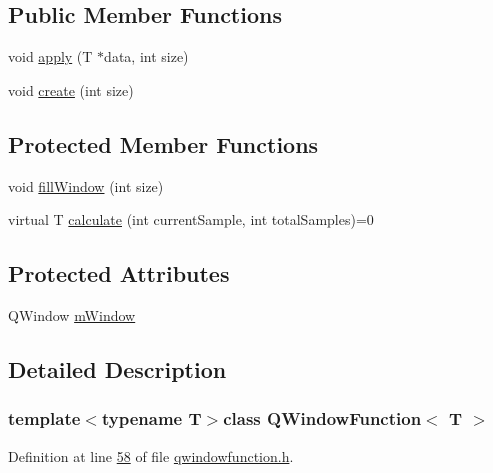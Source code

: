 \subsection*{Public Member Functions}
\begin{DoxyCompactItemize}
\item 
void \hyperlink{a00071_aa4a4f988e1f4b65e4181a0c8c3245a00}{apply} (T $\ast$data, int size)
\item 
void \hyperlink{a00071_a23ec85a35c762367195a47898cc75380}{create} (int size)
\end{DoxyCompactItemize}
\subsection*{Protected Member Functions}
\begin{DoxyCompactItemize}
\item 
void \hyperlink{a00071_abde81294328ded8482380a7cfefab0b9}{fill\+Window} (int size)
\item 
virtual T \hyperlink{a00071_ad58fa8c208b487dc2cbe765053228068}{calculate} (int current\+Sample, int total\+Samples)=0
\end{DoxyCompactItemize}
\subsection*{Protected Attributes}
\begin{DoxyCompactItemize}
\item 
Q\+Window \hyperlink{a00071_ac0e8285a38390b8388bc0be152abcb0a}{m\+Window}
\end{DoxyCompactItemize}


\subsection{Detailed Description}
\subsubsection*{template$<$typename T$>$class Q\+Window\+Function$<$ T $>$}



Definition at line \hyperlink{a00128_source_l00058}{58} of file \hyperlink{a00128_source}{qwindowfunction.\+h}.



